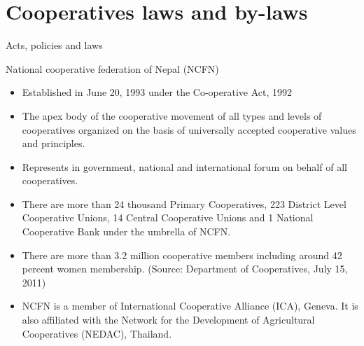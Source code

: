 \documentclass[12pt,ignorenonframetext,aspectratio=169]{beamer}
\providecommand{\tightlist}{%
  \setlength{\itemsep}{0pt}\setlength{\parskip}{0pt}}
\begin{document}
\hypertarget{cooperatives-laws-and-by-laws}{%
\section{Cooperatives laws and
by-laws}\label{cooperatives-laws-and-by-laws}}

\begin{frame}{Acts, policies and laws}
\protect\hypertarget{acts-policies-and-laws}{}
\end{frame}

\begin{frame}{National cooperative federation of Nepal (NCFN)}
\protect\hypertarget{national-cooperative-federation-of-nepal-ncfn}{}
\begin{itemize}
\tightlist
\item
  Established in June 20, 1993 under the Co-operative Act, 1992
\item
  The apex body of the cooperative movement of all types and levels of
  cooperatives organized on the basis of universally accepted
  cooperative values and principles.
\item
  Represents in government, national and international forum on behalf
  of all cooperatives.
\item
  There are more than 24 thousand Primary Cooperatives, 223 District
  Level Cooperative Unions, 14 Central Cooperative Unions and 1 National
  Cooperative Bank under the umbrella of NCFN.
\item
  There are more than 3.2 million cooperative members including around
  42 percent women membership. (Source: Department of Cooperatives, July
  15, 2011)
\item
  NCFN is a member of International Cooperative Alliance (ICA), Geneva.
  It is also affiliated with the Network for the Development of
  Agricultural Cooperatives (NEDAC), Thailand.
\end{itemize}
\end{frame}
\end{document}

